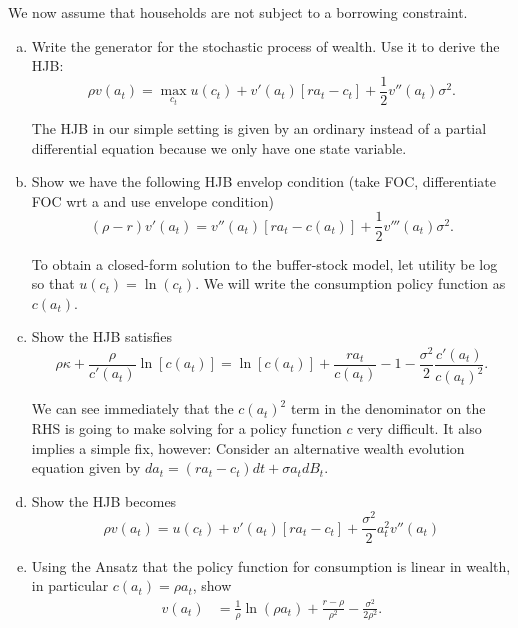\documentclass[11pt]{extarticle}
\theoremstyle{plain}
\theoremstyle{definition}
\begin{document}
We now assume that households are not subject to a borrowing constraint.

\begin{enumerate}[(a)]

\item Write the generator for the stochastic process of wealth. Use it to derive the HJB:
\begin{equation}
	\rho v(a_t) = \max_{c_t} u(c_t) + v'(a_t) [ra_t - c_t] + \frac{1}{2} v''(a_t) \sigma^2.
\end{equation}


The HJB in our simple setting is given by an ordinary instead of a partial differential equation because we only have one state variable. 
\item Show we have the following HJB envelop condition (take FOC, differentiate FOC wrt a and use envelope condition)
\begin{equation*}
	(\rho - r) v'(a_t) = v''(a_t) [ra_t - c(a_t)] + \frac{1}{2} v'''(a_t) \sigma^2.
\end{equation*}

To obtain a closed-form solution to the buffer-stock model, let utility be log so that $u(c_t) = \ln(c_t)$. We will write the consumption policy function as $c(a_t)$. 
\item Show the HJB satisfies
\begin{equation*}
	\rho \kappa + \frac{\rho}{c'(a_t)} \ln[c(a_t)] = \ln[c(a_t)] + \frac{r a_t}{c(a_t)} - 1 - \frac{\sigma^2}{2} \frac{c'(a_t)}{c(a_t)^2}.
\end{equation*}

 We can see immediately that the $c(a_t)^2$ term in the denominator on the RHS is going to make solving for a policy function $c$ very difficult. It also implies a simple fix, however: Consider an alternative wealth evolution equation given by $da_t = (r a_t - c_t)dt + \sigma a_t dB_t$. 
\item Show the HJB becomes $$\rho v(a_t) = u(c_t) + v'(a_t)[ra_t -c_t] + \frac{\sigma^2}{2} a_t^2 v''(a_t)$$ 


\item Using the Ansatz that the policy function for consumption is linear in wealth, in particular $c(a_t) = \rho a_t$, show \begin{align}
	v(a_t) &= \frac{1}{\rho} \ln(\rho a_t) + \frac{r - \rho}{\rho^2} - \frac{\sigma^2}{2\rho^2}.
\end{align} 

\end{enumerate}
\end{document}
